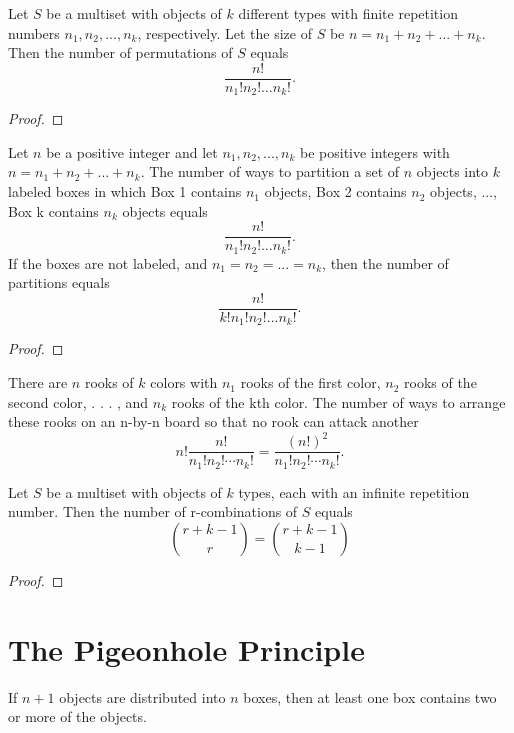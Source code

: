 \begin{theorem}
    \label{thm:2.4.2}
    Let $S$ be a multiset with objects of $k$ different types with finite repetition numbers $n_1, n_2, ... , n_k$, respectively. Let the size of $S$ be $n = n_1 + n_2 + ... + n_k$. Then the number of permutations of $S$ equals
    \[\frac{n!}{n_1!n_2!\dots n_k!}.\]
\end{theorem}
\begin{proof}
\end{proof}

\begin{theorem}
    \label{thm:2.4.3}
    Let $n$ be a positive integer and let $n_1, n_2, ...  ,n_k$ be positive integers with $n = n_1 + n_2 + ... + n_k$. The number of ways to partition a set of $n$ objects into $k$ labeled boxes in which Box 1 contains $n_1$ objects, Box 2 contains $n_2$ objects, ..., Box k contains $n_k$ objects equals
    \[\frac{n!}{n_1!n_2!\dots n_k!}.\]
    If the boxes are not labeled, and $n_1 = n_2 = ... = n_k$, then the number of partitions equals
    \[\frac{n!}{k!n_1!n_2!\dots n_k!}.\]
\end{theorem}
\begin{proof}
\end{proof}

\begin{theorem}
    \label{thm:2.4.4}
    There are $n$ rooks of $k$ colors with $n_1$ rooks of the first color, $n_2$ rooks of the second color, . . . , and $n_k$ rooks of the kth color. The number of ways to arrange these rooks on an n-by-n board so that no rook can attack another 
    \[n!\frac{n!}{n_1!n_2!\cdots n_k!}=\frac{(n!)^2}{n_1!n_2!\cdots n_k!}.\]
\end{theorem}

\begin{theorem}
    \label{thm:2.5.1}
    Let $S$ be a multiset with objects of $k$ types, each with an infinite repetition number. Then the number of r-combinations of $S$ equals
    \[\binom{r+k-1}{r}=\binom{r+k-1}{k-1}\]
\end{theorem}
\begin{proof}
\end{proof}

\chapter{The Pigeonhole Principle}

\begin{theorem}
    \label{thm:3.1.1}
    \leanok
   If $n + 1$ objects are distributed into $n$ boxes, then at least one box 
contains two or more of the objects.
\end{theorem} 

